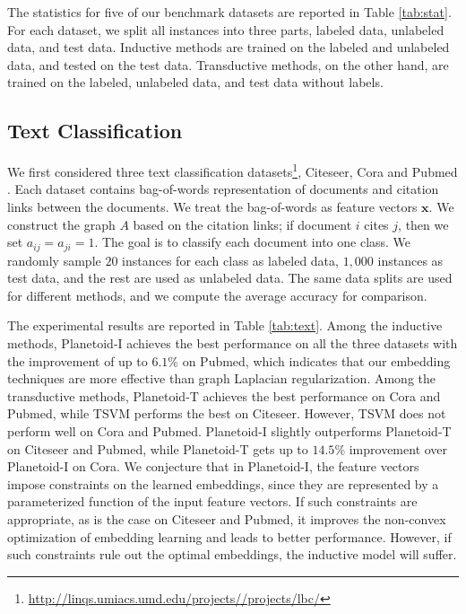 The statistics for five of our benchmark datasets are reported in Table \ref{tab:stat}.
For each dataset, we split all instances into three parts, labeled data, unlabeled data, and test data. Inductive methods are trained on the labeled and unlabeled data, and tested on the test data. Transductive methods, on the other hand, are trained on the labeled, unlabeled data, and test data without labels.






\subsection{Text Classification}



We first considered three text classification datasets\footnote{\url{http://linqs.umiacs.umd.edu/projects//projects/lbc/}}, Citeseer, Cora and Pubmed \cite{sen2008collective}. Each dataset contains bag-of-words representation of documents and citation links between the documents. We treat the bag-of-words as feature vectors $\mathbf{x}$. We construct the graph $A$ based on the citation links; if document $i$ cites $j$, then we set $a_{ij} = a_{ji} = 1$. The goal is to classify each document into one class.
We randomly sample $20$ instances for each class as labeled data, $1,000$ instances as test data, and the rest are used as unlabeled data. The same data splits are used for different methods, and we compute the average accuracy for comparison.

The experimental results are reported in Table \ref{tab:text}. Among the inductive methods, Planetoid-I achieves the best performance on all the three datasets with the improvement of up to $6.1\%$ on Pubmed, which indicates that our embedding techniques are more effective than graph Laplacian regularization.
Among the transductive methods, Planetoid-T achieves the best performance on Cora and Pubmed, while TSVM performs the best on Citeseer. However, TSVM does not perform well on Cora and Pubmed. 
Planetoid-I slightly outperforms Planetoid-T on Citeseer and Pubmed, while Planetoid-T gets up to $14.5\%$ improvement over Planetoid-I on Cora. We conjecture that in Planetoid-I, the feature vectors impose constraints on the learned embeddings, since they are represented by a parameterized function of the input feature vectors. If such constraints are appropriate, as is the case on Citeseer and Pubmed, it improves the non-convex optimization of embedding learning and leads to better performance. However, if such constraints rule out the optimal embeddings, the inductive model will suffer.

